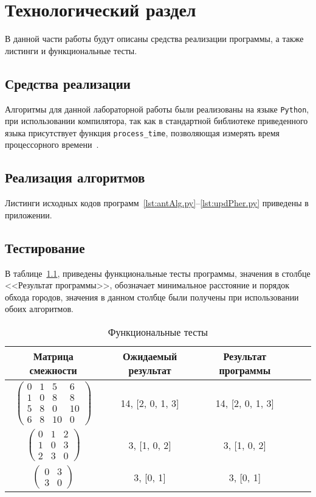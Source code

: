 \chapter{Технологический раздел}

В данной части работы будут описаны средства реализации программы, а также листинги и функциональные тесты.

\section{Средства реализации}
Алгоритмы для данной лабораторной работы были реализованы на языке \texttt{Python}, при использовании компилятора, так как в стандартной библиотеке приведенного языка
присутствует функция \texttt{process\_time}, позволяющая измерять время процессорного времени~\cite{process_time}.
	
	
	
\section{Реализация алгоритмов}
Листинги исходных кодов программ~\ref{lst:antAlg.py}--\ref{lst:updPher.py} приведены в приложении.
	

\section{Тестирование}
В таблице~\ref{t:func_t}, приведены функциональные тесты программы,
значения в столбце <<Результат программы>>, обозначает минимальное расстояние и порядок обхода городов, значения в данном столбце были получены при использовании обоих алгоритмов.
\begin{center}
	\captionsetup{justification=raggedright,singlelinecheck=off}
	\begin{longtable}[c]{|c|c|c|c|c|}
		\caption{Функциональные тесты\label{t:func_t}} \\ \hline
		Матрица смежности & Ожидаемый результат & Результат программы \\
		\hline
		$ \begin{pmatrix}
		 0 &  1  & 5 &  6\\
		1  & 0  & 8  & 8\\
		5  & 8 &  0 & 10\\
		6  & 8 & 10 &  0
		
		\end{pmatrix}$ &
		14, [2, 0, 1, 3] &
		14, [2, 0, 1, 3] \\
		
		$ \begin{pmatrix}
			0 & 1 & 2 \\
			1 & 0 & 3 \\
			2 & 3 & 0	
		\end{pmatrix}$ &
		3, [1, 0, 2] &
		3, [1, 0, 2] \\
		
		$ \begin{pmatrix}
		 0 & 3\\
		 3 & 0
		\end{pmatrix}$ &
		3, [0, 1] &
		3, [0, 1] \\
		\hline
	\end{longtable}
\end{center}
	

